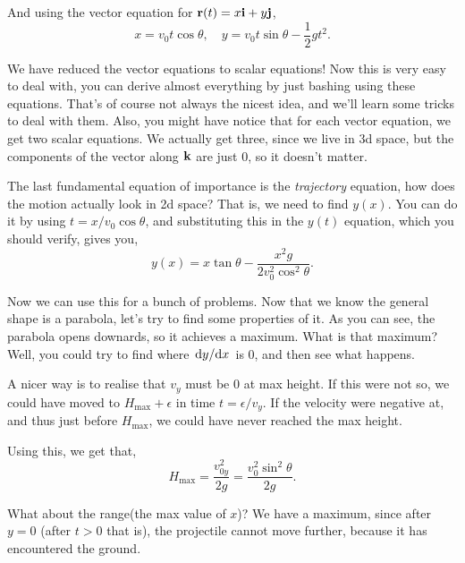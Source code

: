     And using the vector equation for $\mathbf{\boldsymbol{r}}(t) = x\mathbf{\boldsymbol{i}} + y\mathbf{\boldsymbol{j}}$,
    \begin{equation}
        x = v_0t\cos\theta, \quad y = v_0t\sin\theta - \frac{1}{2}gt^2.        
    \end{equation}
    
    We have reduced the vector equations to scalar equations! Now this is very easy
    to deal with, you can derive almost everything by just bashing using these equations.
    That's of course not always the nicest idea, and we'll learn some tricks to deal with them. Also, you might have notice that for each vector equation, we get two scalar
    equations. We actually get three, since we live in 3d space, but the components of 
    the vector along $\mathbf{\boldsymbol{k}}$ are just $0$, so it doesn't matter.

    The last fundamental equation of importance is the \textit{trajectory} equation,
    how does the motion actually look in 2d space? That is, we need to find $y(x)$.
    You can do it by using $t = x/v_0\cos\theta$, and substituting this in the $y(t)$
    equation, which you should verify, gives you,
    \begin{equation}
        y(x) = x\tan\theta - \frac{x^2g}{2v_0^2\cos^2\theta}.        
    \end{equation}
    
    Now we can use this for a bunch of problems. Now that we know the general shape is a parabola,
    let's try to find some properties of it. As you can see, the parabola opens downards, so it
    achieves a maximum. What is that maximum? Well, you could try to find where $\dv*{y}{x}$ is 0,
    and then see what happens. 
    
    A nicer way is to realise that $v_y$ must be 0 at max height. If this were not so, 
    we could have moved to $H_{\text{max}} + \epsilon$ in time $t = \epsilon/v_y$. If the velocity were 
    negative at, and thus just before $H_{\text{max}}$, we could have never reached the max height.

    Using this, we get that,
    \begin{equation}
        H_{\text{max}} = \frac{v_{0y}^2}{2g} = \boxed{\frac{v_0^2\sin^2\theta}{2g}.}
    \end{equation}

    What about the range(the max value of $x$)? We have a maximum, since after $y = 0$ (after $t > 0$ that is), the projectile cannot
    move further, because it has encountered the ground. 
    
